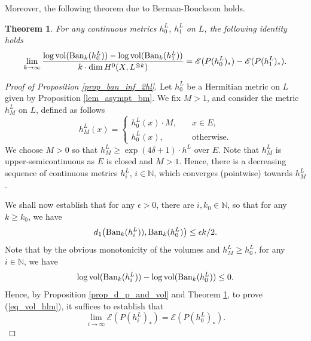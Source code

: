\documentclass[12pt]{article}
\numberwithin{equation}{section}
\theoremstyle{theorem}
\newtheorem{thm}{Theorem}[section]
\theoremstyle{definition}
\theoremstyle{remark}
\newcommand{\nat}{\mathbb{N}}
\begin{document}
	Moreover, the following theorem due to Berman-Boucksom \cite{BermanBouckBalls} holds.
	\begin{thm}\label{thm_balls}
		For any continuous metrics $h^L_0$, $h^L_1$ on $L$, the following identity holds
		\begin{equation}\label{eq_balls}
			\lim_{k \to \infty} \frac{\log {\rm{vol}} ({\rm{Ban}}_k(h^L_0)) - \log {\rm{vol}} ({\rm{Ban}}_k(h^L_1))}{k \cdot \dim H^0(X, L^{\otimes k})} 
			=
			\mathscr{E}(P(h^L_0)_*)
			-
			\mathscr{E}(P(h^L_1)_*).
		\end{equation}
	\end{thm}
	\par 
	\begin{proof}[Proof of Proposition \ref{prop_ban_inf_2hl}]
		Let $h^L_0$ be a Hermitian metric on $L$ given by Proposition \ref{lem_asympt_bm}.
		We fix $M > 1$, and consider the metric $h^L_M$ on $L$, defined as follows 
		\begin{equation}\label{eq_hlm_defn}
			h^L_M(x) = \begin{cases}
				h^L_0(x) \cdot M, \quad & x \in E,
				\\
				h^L_0(x), \quad & \text{otherwise}.
			\end{cases}
		\end{equation}
		We choose $M > 0$ so that $h^L_M \geq \exp(4 \delta + 1) \cdot h^L$ over $E$.
		Note that $h^L_M$ is upper-semicontinuous as $E$ is closed and $M > 1$.
		Hence, there is a decreasing sequence of continuous metrics $h^L_i$, $i \in \nat$, which converges (pointwise) towards $h^L_M$.
		\par 
		We shall now establish that for any $\epsilon > 0$, there are $i, k_0 \in \nat$, so that for any $k \geq k_0$, we have
		\begin{equation}\label{eq_vol_hlm}
			d_1 \big({\rm{Ban}}_k(h^L_i)), {\rm{Ban}}_k(h^L_0) \big)
			\leq
			\epsilon k / 2.
		\end{equation}
		Note that by the obvious monotonicity of the volumes and $h^L_M \geq h^L_0$, for any $i \in \nat$, we have
		\begin{equation}
			\log {\rm{vol}} ({\rm{Ban}}_k(h^L_i)) - \log {\rm{vol}} ({\rm{Ban}}_k(h^L_0)) \leq 0.
		\end{equation}
		Hence, by Proposition \ref{prop_d_p_and_vol} and Theorem \ref{thm_balls}, to prove (\ref{eq_vol_hlm}), it suffices to establish that 
		\begin{equation}\label{eq_cont_energy}
			\lim_{i \to \infty}
			\mathscr{E}(P(h^L_i)_*)
			=
			\mathscr{E}(P(h^L_0)_*).

\end{equation}
\end{proof}
\end{document}
